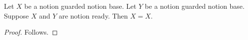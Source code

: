 

\begin{proposition}\label{notion_completed_repeated}
    Let $X$ be a notion guarded notion base.
    Let $Y$ be a notion guarded notion base.
    Suppose $X$ and $Y$ are notion ready.
    Then $X=X$.
\end{proposition}
\begin{proof}
    Follows.
\end{proof}
